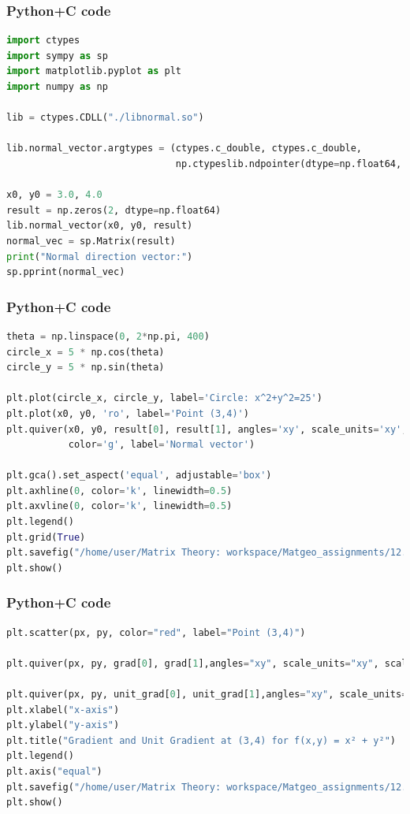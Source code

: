 \documentclass{beamer}
\begin{document}
\begin{frame}[fragile]
    \frametitle{Python+C code}

    \begin{lstlisting}[language=Python]
import ctypes
import sympy as sp
import matplotlib.pyplot as plt
import numpy as np

lib = ctypes.CDLL("./libnormal.so")

lib.normal_vector.argtypes = (ctypes.c_double, ctypes.c_double,
                              np.ctypeslib.ndpointer(dtype=np.float64, ndim=1, flags="C_CONTIGUOUS"))

x0, y0 = 3.0, 4.0
result = np.zeros(2, dtype=np.float64)
lib.normal_vector(x0, y0, result)
normal_vec = sp.Matrix(result)
print("Normal direction vector:")
sp.pprint(normal_vec)


    \end{lstlisting}
\end{frame}

\begin{frame}[fragile]
    \frametitle{Python+C code}

    \begin{lstlisting}[language=Python]
theta = np.linspace(0, 2*np.pi, 400)
circle_x = 5 * np.cos(theta)
circle_y = 5 * np.sin(theta)

plt.plot(circle_x, circle_y, label='Circle: x^2+y^2=25')
plt.plot(x0, y0, 'ro', label='Point (3,4)')
plt.quiver(x0, y0, result[0], result[1], angles='xy', scale_units='xy', scale=1,
           color='g', label='Normal vector')

plt.gca().set_aspect('equal', adjustable='box')
plt.axhline(0, color='k', linewidth=0.5)
plt.axvline(0, color='k', linewidth=0.5)
plt.legend()
plt.grid(True)
plt.savefig("/home/user/Matrix Theory: workspace/Matgeo_assignments/12.560/figs/Figure_2.png")
plt.show()
    \end{lstlisting}
\end{frame}

\begin{frame}[fragile]
    \frametitle{Python+C code}

    \begin{lstlisting}[language=Python]
plt.scatter(px, py, color="red", label="Point (3,4)")

plt.quiver(px, py, grad[0], grad[1],angles="xy", scale_units="xy", scale=1, color="blue", width=0.005,label="Full ∇f at (3,4)")

plt.quiver(px, py, unit_grad[0], unit_grad[1],angles="xy", scale_units="xy", scale=1, color="green", width=0.005,label="Unit ∇f at (3,4)")
plt.xlabel("x-axis")
plt.ylabel("y-axis")
plt.title("Gradient and Unit Gradient at (3,4) for f(x,y) = x² + y²")
plt.legend()
plt.axis("equal")
plt.savefig("/home/user/Matrix Theory: workspace/Matgeo_assignments/12.560/figs/Figure_1.png")
plt.show()
    \end{lstlisting}
\end{frame}
\end{document}
